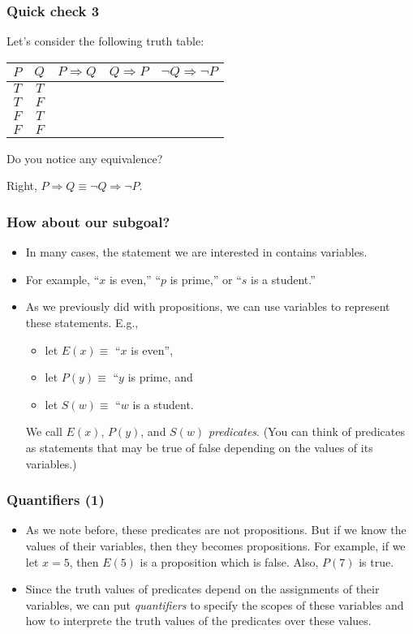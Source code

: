 \begin{frame}\frametitle{Quick check 3}
  Let's consider the following truth table:
  \begin{tcolorbox}
    \begin{tabular}{|c|c||c|c|c|}
      \hline
      $P$ & $Q$ & $P\Rightarrow Q$ & $Q\Rightarrow P$ & $\neg Q \Rightarrow \neg P$ \\
      \hline
      $T$ & $T$ & & & \\
      $T$ & $F$ & & & \\
      $F$ & $T$ & & & \\
      $F$ & $F$ & & & \\
      \hline
    \end{tabular}
  \end{tcolorbox}
  \pause
  Do you notice any equivalence?
  \pause

  Right, $P\Rightarrow Q\equiv \neg Q\Rightarrow\neg P$.
\end{frame}

\begin{frame}\frametitle{How about our subgoal?}
  \begin{itemize}
  \item
    In many cases, the statement we are interested in contains variables.

  \item
    For example, ``$x$ is even,'' ``$p$ is prime,'' or ``$s$ is a student.''
    \pause

  \item
    As we previously did with propositions, we can use variables to
    represent these statements.  E.g.,
    \begin{itemize}
    \item let $E(x)\equiv$ ``$x$ is even'',
    \item let $P(y)\equiv$ ``$y$ is prime, and
    \item let $S(w)\equiv$ ``$w$ is a student.
    \end{itemize}
    We call $E(x)$, $P(y)$, and $S(w)$ {\em predicates}. (You can
    think of predicates as statements that may be true of false
    depending on the values of its variables.)
  \end{itemize}
\end{frame}

\begin{frame}\frametitle{Quantifiers (1)}
  \begin{itemize}
  \item As we note before, these predicates are not propositions.  But
    if we know the values of their variables, then they becomes
    propositions.  For example, if we let $x=5$, then $E(5)$ is a
    proposition which is false.  Also, $P(7)$ is true.
  \item Since the truth values of predicates depend on the assignments
    of their variables, we can put {\em quantifiers} to specify the
    scopes of these variables and how to interprete the truth values of
    the predicates over these values.
  \end{itemize}
\end{frame}

